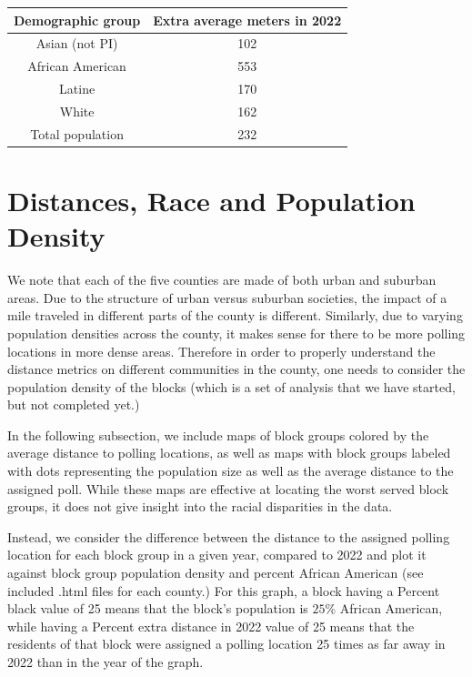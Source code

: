 \documentclass[11pt]{article}
\theoremstyle{remark}
\theoremstyle{definition}
\begin{document}
\begin{tabular}{|c|c|}
	\hline
	Demographic group & Extra average meters in 2022 \\ \hline
	Asian (not PI) &   102 \\ \hline
	African American &   553  \\ \hline
	Latine & 170 \\ \hline
	White &  162\\ \hline
	Total population &  232\\ \hline
\end{tabular}

\section{Distances, Race and Population Density}
We note that each of the five counties are made of both urban and suburban areas. Due to the structure of urban versus suburban societies, the impact of a mile traveled in different parts of the county is different. Similarly, due to varying population densities across the county, it makes sense for there to be more polling locations in more dense areas. Therefore in order to properly understand the distance metrics on different communities in the county, one needs to consider the population density of the blocks (which is a set of analysis that we have started, but not completed yet.)

In the following subsection, we include maps of block groups colored by the average distance to polling locations, as well as maps with block groups labeled with dots representing the population size as well as the average distance to the assigned poll. While these maps are effective at locating the worst served block groups, it does not give insight into the racial disparities in the data. 

Instead, we consider the difference between the distance to the assigned polling location for each block group in a given year, compared to 2022 and plot it against block group population density and percent African American (see included .html files for each county.) For this graph, a block having a Percent black value of 25 means that the block's population is $25\%$ African American, while having a Percent extra distance in 2022 value of 25 means that the residents of that block were assigned a polling location 25 times as far away in 2022 than in the year of the graph.
\end{document}
